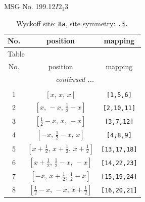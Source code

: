 \documentclass[fleqn,8pt]{jsarticle}
\begin{document}
\setcounter{MaxMatrixCols}{32}

\renewcommand{\tablename}{Table~}
\renewcommand{\figurename}{Figure~}
\begin{center}
\LARGE
MSG No. 199.12\quad$I2_{1}3$
\end{center}
\renewcommand{\arraystretch}{1.2}
\begin{longtable}{ccc}
\caption{Wyckoff site: {\tt 8a}, site symmetry: {\tt .3.}}
 \\
 \hline \hline
No. & position & mapping \\ \hline \endfirsthead

\multicolumn{2}{l}{\tablename\ \thetable{}} \\
 \hline \hline
No. & position & mapping \\ \hline \endhead

 \hline \hline
\multicolumn{2}{r}{\footnotesize\it continued ...} \\ \endfoot

 \hline \hline
\multicolumn{2}{r}{} \\ \endlastfoot

1 & $\left[ x,\, x,\, x \right]$ & {\tt [1,5,6]} \\ \hline
2 & $\left[ x,\, - x,\, \frac{1}{2} - x \right]$ & {\tt [2,10,11]} \\ \hline
3 & $\left[ \frac{1}{2} - x,\, x,\, - x \right]$ & {\tt [3,7,12]} \\ \hline
4 & $\left[ - x,\, \frac{1}{2} - x,\, x \right]$ & {\tt [4,8,9]} \\ \hline
5 & $\left[ x + \frac{1}{2},\, x + \frac{1}{2},\, x + \frac{1}{2} \right]$ & {\tt [13,17,18]} \\ \hline
6 & $\left[ x + \frac{1}{2},\, \frac{1}{2} - x,\, - x \right]$ & {\tt [14,22,23]} \\ \hline
7 & $\left[ - x,\, x + \frac{1}{2},\, \frac{1}{2} - x \right]$ & {\tt [15,19,24]} \\ \hline
8 & $\left[ \frac{1}{2} - x,\, - x,\, x + \frac{1}{2} \right]$ & {\tt [16,20,21]} \\
\end{longtable}
\renewcommand{\arraystretch}{1.2}
\end{document}
